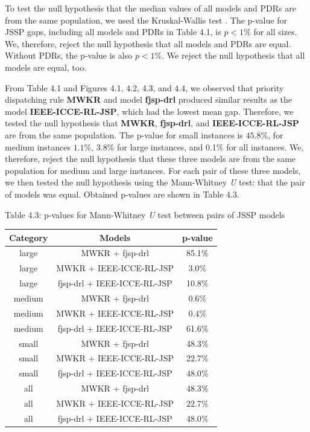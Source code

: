 To test the null hypothesis that the median values of all models and PDRs are from the same population, we used the Kruskal-Wallis test \cite{doi:10.1080/01621459.1952.10483441}. The p-value for JSSP gaps, including all models and PDRs in Table 4.1, is $p < 1\%$ for all sizes. We, therefore, reject the null hypothesis that all models and PDRs are equal. Without PDRs, the p-value is also $p < 1\%$. We reject the null hypothesis that all models are equal, too.
\par  
From Table 4.1 and Figures 4.1, 4.2, 4.3, and 4.4, we observed that priority dispatching rule \textbf{MWKR} and model \textbf{fjsp-drl} produced similar results as the model \textbf{IEEE-ICCE-RL-JSP}, which had the lowest mean gap. Therefore, we tested the null hypothesis that \textbf{MWKR}, \textbf{fjsp-drl}, and \textbf{IEEE-ICCE-RL-JSP} are from the same population. The p-value for small instances is $45.8\%$, for medium instances $1.1\%$, $3.8\%$ for large instances, and 0.1$\%$ for all instances. We, therefore, reject the null hypothesis that these three models are from the same population for medium and large instances.
For each pair of these three models, we then tested the null hypothesis using the Mann-Whitney \textit{U} test: that the pair of models was equal. Obtained p-values are shown in Table 4.3.

\begin{table}
    Table 4.3: p-values for Mann-Whitney \textit{U} test between pairs of JSSP models\\
    \vspace{1mm}
    \label{table:4.3}
    \begin{tabular}{ccc}
    \toprule
    Category & Models & p-value \\
    \midrule
    large & MWKR + fjsp-drl & 85.1$\%$ \\
    large & MWKR + IEEE-ICCE-RL-JSP & 3.0$\%$ \\
    large & fjsp-drl + IEEE-ICCE-RL-JSP & 10.8$\%$ \\
    medium & MWKR + fjsp-drl & 0.6$\%$ \\
    medium & MWKR + IEEE-ICCE-RL-JSP & 0.4$\%$ \\
    medium & fjsp-drl + IEEE-ICCE-RL-JSP & 61.6$\%$ \\
    small & MWKR + fjsp-drl & 48.3$\%$ \\
    small & MWKR + IEEE-ICCE-RL-JSP & 22.7$\%$ \\
    small & fjsp-drl + IEEE-ICCE-RL-JSP & 48.0$\%$ \\
    all & MWKR + fjsp-drl & 48.3$\%$ \\
    all & MWKR + IEEE-ICCE-RL-JSP & 22.7$\%$ \\
    all & fjsp-drl + IEEE-ICCE-RL-JSP & 48.0$\%$ \\
    \bottomrule
    \end{tabular}
\end{table}


